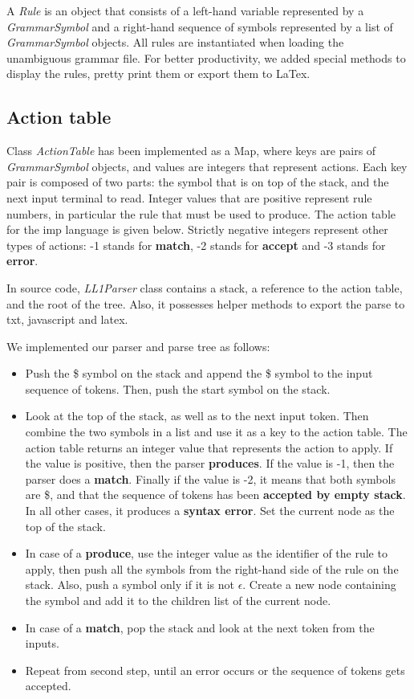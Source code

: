 A \textit{Rule} is an object that consists of a left-hand variable represented by a \textit{GrammarSymbol} and a right-hand sequence
of symbols represented by a list of \textit{GrammarSymbol} objects. All rules are instantiated when loading the unambiguous grammar file.
For better productivity, we added special methods to display the rules, pretty print them or export them to LaTex.

\subsection{Action table}

Class \textit{ActionTable} has been implemented as a Map, where keys are pairs of \textit{GrammarSymbol} objects, and values are integers
that represent actions. Each key pair is composed of two parts: the symbol that is on top of the stack, and the next input terminal to read.
Integer values that are positive represent rule numbers, in particular the rule that must be used to produce. The
action table for the imp language is given below. Strictly negative integers
represent other types of actions: -1 stands for \textbf{match}, -2 stands for \textbf{accept} and -3 stands for \textbf{error}.

In source code, \textit{LL1Parser} class contains a stack, a reference to the action table, and the root of the tree. Also, it possesses helper
methods to export the parse to txt, javascript and latex.

We implemented our parser and parse tree as follows:
\begin{itemize}
  \item Push the \$ symbol on the stack and append the \$ symbol to the input sequence of tokens. Then, push the start symbol 
        on the stack.
  \item Look at the top of the stack, as well as to the next input token. Then combine the two symbols in a list and use it as a key to the
        action table. The action table returns an integer value that represents the action to apply. If the value is positive, then the parser 
        \textbf{produces}. If the value is -1, then the parser does a \textbf{match}. Finally if the value is -2, it means that both symbols
        are \$, and that the sequence of tokens has been \textbf{accepted by empty stack}. In all other cases, it produces a \textbf{syntax error}.
        Set the current node as the top of the stack.
  \item In case of a \textbf{produce}, use the integer value as the identifier of the rule to apply, then push all the symbols from the 
        right-hand side of the rule on the stack. Also, push a symbol only if it is not $\epsilon$. Create a new node containing the symbol
        and add it to the children list of the current node.
  \item In case of a \textbf{match}, pop the stack and look at the next token from the inputs.
  \item Repeat from second step, until an error occurs or the sequence of tokens gets accepted.
\end{itemize}

